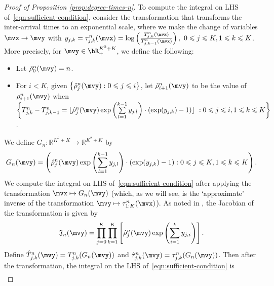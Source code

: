 \documentclass[letterpaper,11pt,reqno]{amsart}
\theoremstyle{definition}
\renewcommand{\le}{\leqslant}
\renewcommand{\leq}{\leqslant}
\newcommand{\set}[1]{\left\{#1\right\}}
\newcommand{\fJ}{\mathfrak{J}}\newcommand{\fK}{\mathfrak{K}}\newcommand{\fL}{\mathfrak{L}}
\begin{document}
\begin{proof}[Proof of Proposition \ref{prop:degree-times-n}]

To compute the integral on LHS of~\eqref{eqn:sufficient-condition}, consider the transformation \textcolor{black}{that transforms} the inter-arrival times \textcolor{black}{to an} exponential scale, where we make the change of variables $\mvx \to \mvy$ with { $y_{j,k} = \tau^n_{j,k}(\mvx) = \log\left(\frac{T_{j,k}^n(\mvx)}{T_{j,k-1}^n(\mvx)}\right), \ 0 \le j \le K, 1 \le k \le K$}. More precisely, for $\mvy \in \bR_+^{K^2 + K}$, we define the following:\begin{itemize}
    \item Let $\hat{\rho}^n_0(\mvy) = n$.
    \item For $i < K$, given $\set{\hat{\rho}^n_j(\mvy):0\leq j\leq i}$, let $\hat{\rho}^n_{i+1}(\mvy)$ to be the value of $\rho^n_{i+1}(\mvy)$ when $\set{T_{j,k}^n-T_{j,k-1}^n= \lfloor \hat{\rho}^n_j(\mvy)\exp\left(\sum\limits_{l=1}^{k-1}y_{j,l}\right)\cdot\left(\exp(y_{j,k})-1\right) \rfloor \ : 0\leq j\leq i,1\leq k\leq K}$. 
\end{itemize}  
We define $G_n: \mathbb{R}^{K^2 + K} \rightarrow \mathbb{R}^{K^2 + K}$ by $$G_n(\mvy) = \left(\hat{\rho}^n_j(\mvy)\exp\left(\sum\limits_{l=1}^{k-1}y_{j,l}\right)\cdot \left(\exp(y_{j,k})-1\right): 0\leq j\leq K, 1\leq k\leq K \right).$$ We compute the integral on LHS of~\eqref{eqn:sufficient-condition} after applying the transformation $\mvx \mapsto G_n(\mvy)$ \textcolor{black}{(which, as we will see, is the `approximate' inverse of the transformation $\mvy \mapsto \tau^n_{1:K}(\mvx)$)}. 
 As noted in \cite{BBDS04_macro}, the Jacobian of the transformation is given by \begin{align}\label{Jac}
    \fJ_n(\mvy) = \prod_{j=0}^{K}\prod_{k=1}^K \left[\hat{\rho}^n_j(\mvy)\exp\left({\sum_{i=1}^{k}y_{j,i}}\right)\right].
    \end{align} 
    Define $\hat{T}^n_{j,k}(\mvy) = T^n_{j,k}(G_n(\mvy))$ and $\hat{\tau}^n_{j,k}(\mvy)=\tau^n_{j,k}(G_n(\mvy))$. Then after the transformation, the integral on the LHS of~\eqref{eqn:sufficient-condition} is\begin{align*}

\end{align*}
\end{proof}
\end{document}
